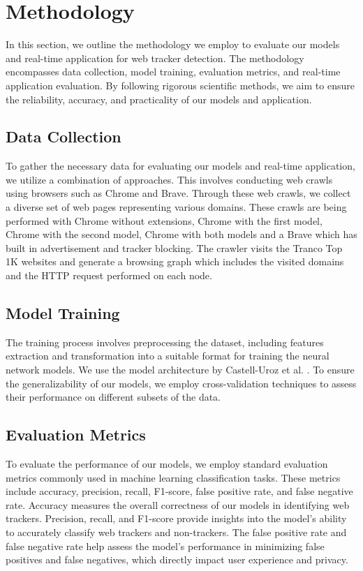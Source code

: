 \section{Methodology}

In this section, we outline the methodology we employ to evaluate our models and real-time application for web tracker detection.
The methodology encompasses data collection, model training, evaluation metrics, and real-time application evaluation. By following
rigorous scientific methods, we aim to ensure the reliability, accuracy, and practicality of our models and application.

\subsection{Data Collection}
To gather the necessary data for evaluating our models and real-time application, we utilize a combination of approaches.
This involves conducting web crawls using browsers such as Chrome and Brave. Through these web crawls,
we collect a diverse set of web pages representing various domains. These crawls are being performed with Chrome without extensions,
Chrome with the first model, Chrome with the second model, Chrome with both models and a Brave which has built in advertisement and tracker blocking.
The crawler visits the Tranco \cite{pochat2018tranco} Top 1K websites and generate a browsing graph which includes the visited domains and the HTTP request
performed on each node.

\subsection{Model Training}
The training process involves preprocessing the dataset, including features extraction and
transformation into a suitable format for training the neural network models. We use the model architecture by Castell-Uroz et al. \cite{castell2020url}.
To ensure the generalizability of our models, we employ cross-validation techniques
to assess their performance on different subsets of the data.

\subsection{Evaluation Metrics}
To evaluate the performance of our models, we employ standard evaluation metrics commonly used in machine learning
classification tasks. These metrics include accuracy, precision, recall, F1-score, false positive rate, and false negative rate.
Accuracy measures the overall correctness of our models in identifying web trackers. Precision, recall, and F1-score provide
insights into the model's ability to accurately classify web trackers and non-trackers. The false positive rate and false negative
rate help assess the model's performance in minimizing false positives and false negatives, which directly impact user
experience and privacy.

